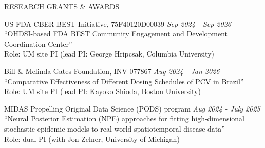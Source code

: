 \documentclass{resume} %
\begin{document}
\begin{rSection}{RESEARCH GRANTS \& AWARDS}
	
	\hspace*{-0.25in} US FDA CBER BEST Initiative,  75F40120D00039    \hfill{\em Sep 2024 - Sep 2026} \\
	``OHDSI-based FDA BEST Community Engagement and Development Coordination Center'' \\
	Role: UM site PI (lead PI: George Hripcsak, Columbia University)
	\medskip 
	
	\hspace*{-0.25in} Bill \& Melinda Gates Foundation, INV-077867     \hfill{\em Aug 2024 - Jan 2026} \\
	``Comparative Effectiveness of Different Dosing Schedules of PCV in Brazil'' \\
	Role: UM site PI (lead PI: Kayoko Shioda, Boston University)
	
		\medskip 
	
	\hspace*{-0.25in} MIDAS Propelling Original Data Science (PODS) program \hfill{\em Aug 2024 - July 2025} \\
	``Neural Posterior Estimation (NPE) approaches for fitting high-dimensional stochastic epidemic models to real-world spatiotemporal disease data'' \\
	Role: dual PI (with Jon Zelner, University of Michigan)
	
\end{rSection}


\end{document}
